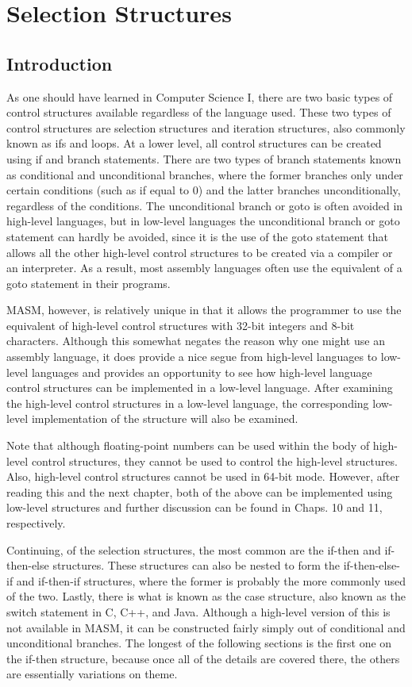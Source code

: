 \documentclass[10pt]{book}
\begin{document}
\section{Selection Structures}
\subsection{Introduction}
As one should have learned in Computer Science I, there are two basic types of control structures available regardless of the language used. These two types of control structures are selection structures and iteration structures, also commonly known as ifs and loops.
At a lower level, all control structures can be created using if and branch statements. There are two types of branch statements known as conditional and unconditional branches, where the former branches only under certain conditions (such as if equal to 0) and the latter branches unconditionally, regardless of the conditions. The unconditional branch or goto is often avoided in high-level languages, but in low-level languages the unconditional branch or goto statement can hardly be avoided, since it is the use of the goto statement that allows all the other high-level control structures to be created via a compiler or an interpreter. As a result, most assembly languages often use the equivalent of a goto statement in their programs.

MASM, however, is relatively unique in that it allows the programmer to use the equivalent of high-level control structures with 32-bit integers and 8-bit characters. Although this somewhat negates the reason why one might use an assembly language, it does provide a nice segue from high-level languages to low-level languages and provides an opportunity to see how high-level language control structures can be implemented in a low-level language. After examining the high-level control structures in a low-level language, the corresponding low-level implementation of the structure will also be examined.

Note that although floating-point numbers can be used within the body of high-level control structures, they cannot be used to control the high-level structures. Also, high-level control structures cannot be used in 64-bit mode. However, after reading this and the next chapter, both of the above can be implemented using low-level structures and further discussion can be found in Chaps. 10 and 11, respectively.

Continuing, of the selection structures, the most common are the if-then and if-then-else structures. These structures can also be nested to form the if-then-else-if and if-then-if structures, where the former is probably the more commonly used of the two. Lastly, there is what is known as the case structure, also known as the switch statement in C, C++, and Java. Although a high-level version of this is not available in MASM, it can be constructed fairly simply out of conditional and unconditional branches. The longest of the following sections is the first one on the if-then structure, because once all of the details are covered there, the others are essentially variations on theme.
\end{document}
